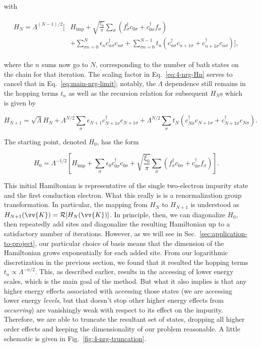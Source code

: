 with

\begin{align}
\begin{split}
  H_N = \Lambda^{(N-1)/2} \Bigg[& H_{\mathrm{imp}} + \sqrt{\frac{\xi_0}{\pi}}\sum_\sigma \left(f^\dagger_\sigma c_{0\sigma} + c^\dagger_{0\sigma}f_\sigma\right) \\
  & + \sum_{\sigma n=0}^{N} \epsilon_n c^\dagger_{n\sigma}c_{n\sigma} + \sum_{\sigma n=0}^{N-1}t_n\left( c^\dagger_{n\sigma}c_{n+1\sigma} + c^\dagger_{n+1\sigma}c_{n\sigma} \right) \Bigg],
\end{split}\label{eq:4-nrg-Hn}
\end{align}

where the $n$ sums now go to $N$, corresponding to the number of bath states on the chain for that iteration. The scaling factor in Eq.~\eqref{eq:4-nrg-Hn} serves to cancel that in Eq.~\eqref{eq:main-nrg-limit}; notably, the $\Lambda$ dependence still remains in the hopping terms $t_n$ as well as the recursion relation for subsequent $H_N$s which is given by

\begin{equation}
  H_{N+1} = \sqrt{\Lambda}H_N + \Lambda^{N/2}\sum_\sigma \epsilon_{N+1}c^\dagger_{N+1\sigma}c_{N+1\sigma} + \Lambda^{N/2}\sum_\sigma t_N\left( c^\dagger_{N\sigma}c_{N+1\sigma} + c^\dagger_{N+1\sigma}c_{N\sigma} \right).
\end{equation}

The starting point, denoted $H_0$, has the form

\begin{equation}
  H_0 = \Lambda^{-1/2} \left[H_{\mathrm{imp}} + \sum_\sigma \epsilon_0 c^\dagger_{0\sigma}c_{0\sigma} + \sqrt{\frac{\xi_0}{\pi}} \sum_\sigma \left( f^\dagger_\sigma c_{0\sigma} + c^\dagger_{0\sigma}f_\sigma \right)\right].
\end{equation}

This initial Hamiltonian is representative of the single two-electron impurity state and the first conduction electron. What this really is is a renormalization group transformation. In particular, the mapping from $H_N$ to $H_{N+1}$ is understood as $H_{N+1}(\vv{K}) = \mathcal{R}[H_N(\vv{K})]$. In principle, then, we can diagonalize $H_0$, then repeatedly add sites and diagonalize the resulting Hamiltonian up to a satisfactory number of iterations. However, as we will see in Sec.~\ref{sec:application-to-project}, our particular choice of basis means that the dimension of the Hamiltonian grows exponentially for each added site. From our logarithmic discretization in the previous section, we found that it resulted the hopping terms $t_n \propto \Lambda^{-n/2}$. This, as described earlier, results in the accessing of lower energy scales, which is the main goal of the method. But what it also implies is that any higher energy effects associated with accessing those states (we are accessing lower energy \textit{levels}, but that doesn't stop other higher energy effects from \textit{occurring}) are vanishingly weak with respect to its effect on the impurity. Therefore, we are able to truncate the resultant set of states, dropping all higher order effects and keeping the dimensionality of our problem reasonable. A little schematic is given in Fig.~\ref{fig:4-nrg-truncation}.

